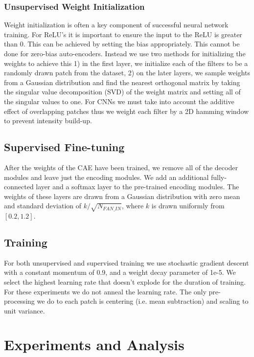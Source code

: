 \documentclass{article} \usepackage{iclr2015,times}
\begin{document}
\subsubsection{Unsupervised Weight Initialization}
Weight initialization is often a key component of successful neural network training. For ReLU's it is important to ensure the input to the ReLU is greater than 0. This can be achieved by setting the bias appropriately. This cannot be done for zero-bias auto-encoders. Instead we use two methods for initializing the weights to achieve this 1)  in the first layer, we initialize each of the filters to be a randomly drawn patch from the dataset, 2) on the later layers, we sample weights from a Gaussian distribution and find the nearest orthogonal matrix by taking the singular value decomposition (SVD) of the weight matrix and setting all of the singular values to one. For CNNs we must take into account the additive effect of overlapping patches thus we weight each filter by a 2D hamming window to prevent intensity build-up.

\subsection{Supervised Fine-tuning}
After the weights of the CAE have been trained, we remove all of the decoder modules and leave just the encoding modules. We add an additional fully-connected layer and a softmax layer to the pre-trained encoding modules. The weights of these layers are drawn from a Gaussian distribution with zero mean and standard deviation of $ k/\sqrt{N_{FAN\_IN}}$, where $k$ is drawn uniformly from $\left[0.2, 1.2\right]$. 

\subsection{Training}
For both unsupervised and supervised training we use stochastic gradient descent with a constant  momentum of 0.9, and a weight decay parameter of 1e-5. We select the highest learning rate that doesn't explode for the duration of training. For these experiments we do not anneal the learning rate. The only pre-processing we do to each patch is centering (i.e. mean subtraction) and scaling to unit variance.
 
\section{Experiments and Analysis}
\label{sec:experiments}
\end{document}

